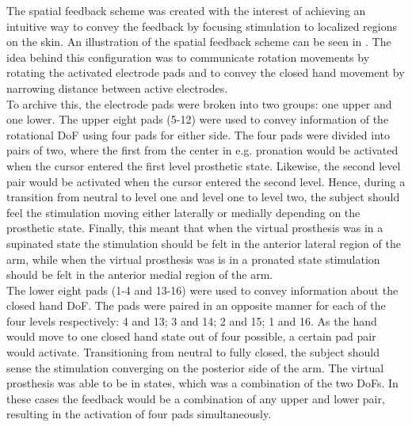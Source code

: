 The spatial feedback scheme was created with the interest of achieving an intuitive way to convey the feedback by focusing stimulation to localized regions on the skin. An illustration of the spatial feedback scheme can be seen in . The idea behind this configuration was to communicate rotation movements by rotating the activated electrode pads and to convey the closed hand movement by narrowing distance between active electrodes. \\
To archive this, the electrode pads were broken into two groups: one upper and one lower. The upper eight pads (5-12) were used to convey information of the rotational DoF using four pads for either side.  The four pads were divided into pairs of two, where the first from the center in e.g. pronation would be activated when the cursor entered the first level prosthetic state. Likewise, the second level pair would be activated when the cursor entered the second level. Hence, during a transition from neutral to level one and level one to level two, the subject should feel the stimulation moving either laterally or medially depending on the prosthetic state. Finally, this meant that when the virtual prosthesis was in a supinated state the stimulation should be felt in the anterior lateral region of the arm, while when the virtual prosthesis was is in a pronated state stimulation should be felt in the anterior medial region of the arm.   \\
The lower eight pads (1-4 and 13-16) were used to convey information about the closed hand DoF. The pads were paired in an opposite manner for each of the four levels respectively: 4 and 13; 3 and 14; 2 and 15; 1 and 16. As the hand would move to one closed hand state out of four possible, a certain pad pair would activate. Transitioning from neutral to fully closed, the subject should sense the stimulation converging on the posterior side of the arm. The virtual prosthesis was able to be in states, which was a combination of the two DoFs. In these cases the feedback would be a combination of any upper and lower pair, resulting in the activation of four pads simultaneously. %

